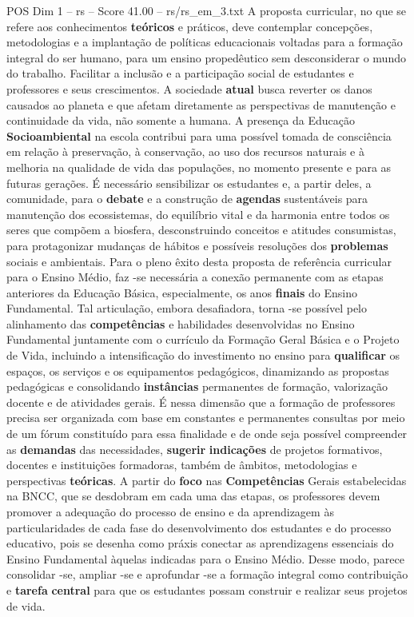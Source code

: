 \begin{textsample}{POS Dim 1 – rs – Score 41.00 – rs/rs\_em\_3.txt}
A proposta curricular, no que se refere aos conhecimentos \textbf{teóricos} e práticos, deve contemplar concepções, metodologias e a implantação de políticas educacionais voltadas para a formação integral do ser humano, para um ensino propedêutico sem desconsiderar o mundo do trabalho.
Facilitar a inclusão e a participação social de estudantes e professores e seus crescimentos.
A sociedade \textbf{atual} busca reverter os danos causados ao planeta e que afetam diretamente as perspectivas de manutenção e continuidade da vida, não somente a humana.
A presença da Educação \textbf{Socioambiental} na escola contribui para uma possível tomada de consciência em relação à preservação, à conservação, ao uso dos recursos naturais e à melhoria na qualidade de vida das populações, no momento presente e para as futuras gerações.
É necessário sensibilizar os estudantes e, a partir deles, a comunidade, para o \textbf{debate} e a construção de \textbf{agendas} sustentáveis para manutenção dos ecossistemas, do equilíbrio vital e da harmonia entre todos os seres que compõem a biosfera, desconstruindo conceitos e atitudes consumistas, para protagonizar mudanças de hábitos e possíveis resoluções dos \textbf{problemas} sociais e ambientais.
Para o pleno êxito desta proposta de referência curricular para o Ensino Médio, faz -se necessária a conexão permanente com as etapas anteriores da Educação Básica, especialmente, os anos \textbf{finais} do Ensino Fundamental.
Tal articulação, embora desafiadora, torna -se possível pelo alinhamento das \textbf{competências} e habilidades desenvolvidas no Ensino Fundamental juntamente com o currículo da Formação Geral Básica e o Projeto de Vida, incluindo a intensificação do investimento no ensino para \textbf{qualificar} os espaços, os serviços e os equipamentos pedagógicos, dinamizando as propostas pedagógicas e consolidando \textbf{instâncias} permanentes de formação, valorização docente e de atividades gerais.
É nessa dimensão que a formação de professores precisa ser organizada com base em constantes e permanentes consultas por meio de um fórum constituído para essa finalidade e de onde seja possível compreender as \textbf{demandas} das necessidades, \textbf{sugerir} \textbf{indicações} de projetos formativos, docentes e instituições formadoras, também de âmbitos, metodologias e perspectivas \textbf{teóricas}.
A partir do \textbf{foco} nas \textbf{Competências} Gerais estabelecidas na BNCC, que se desdobram em cada uma das etapas, os professores devem promover a adequação do processo de ensino e da aprendizagem às particularidades de cada fase do desenvolvimento dos estudantes e do processo educativo, pois se desenha como práxis conectar as aprendizagens essenciais do Ensino Fundamental àquelas indicadas para o Ensino Médio.
Desse modo, parece consolidar -se, ampliar -se e aprofundar -se a formação integral como contribuição e \textbf{tarefa} \textbf{central} para que os estudantes possam construir e realizar seus projetos de vida.


\end{textsample}
